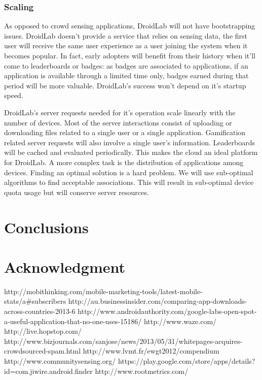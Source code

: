 \documentclass[conference,letterpaper]{IEEEtran}
\begin{document}
\subsubsection{Scaling}
As opposed to crowd sensing applications, DroidLab will not have bootstrapping issues. DroidLab doesn't provide a service that relies on sensing data, the first user will receive the same user experience as a user joining the system when it becomes popular. In fact, early adopters will benefit from their history when it'll come to leaderboards or badges: as badges are associated to applications, if an application is available through a limited time only, badges earned during that period will be more valuable. DroidLab's success won't depend on it's startup speed.

DroidLab's server requests needed for it's operation scale linearly with the number of devices. Most of the server interactions consist of uploading or downloading files related to a single user or a single application. Gamification related server requests will also involve a single user's information. Leaderboards will be cached and evaluated periodically. This makes the cloud an ideal platform for DroidLab. A more complex task is the distribution of applications among devices. Finding an optimal solution is a hard problem. We will use sub-optimal algorithms to find acceptable associations. This will result in sub-optimal device quota usage but will conserve server resources.

\section{Conclusions}
\label{sec:conclusion_and_future_work}

\section{Acknowledgment}
\label{sec:acknowledgment}
http://mobithinking.com/mobile-marketing-tools/latest-mobile-stats/a\#subscribers
http://au.businessinsider.com/comparing-app-downloads-across-countries-2013-6
http://www.androidauthority.com/google-labs-open-spot-a-useful-application-that-no-one-uses-15186/
http://www.waze.com/
http://live.hopstop.com/
http://www.bizjournals.com/sanjose/news/2013/05/31/whitepages-acquires-crowdsourced-spam.html
http://www.lvmt.fr/ewgt2012/compendium
http://www.communitysensing.org/
https://play.google.com/store/apps/details?id=com.jiwire.android.finder
http://www.rootmetrics.com/
\end{document}
